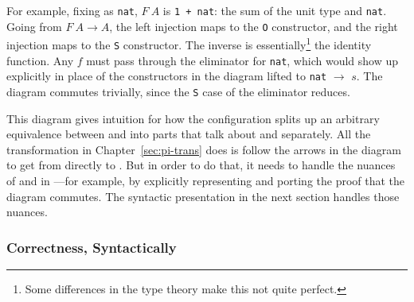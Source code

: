 For example, fixing \Aa as \lstinline{nat}, $F\ A$ is \lstinline{1 + nat}:
the sum of the unit type and \lstinline{nat}.
Going from $F\ A \rightarrow A$, the left injection maps to the \lstinline{O} constructor, and the right injection maps to the \lstinline{S} constructor.
The inverse is essentially\footnote{Some differences in the type theory make this not quite perfect.} the identity function.
Any $f$ must pass through the eliminator for \lstinline{nat}, which would show up explicitly in place of the constructors
in the diagram lifted to \lstinline{nat} $\rightarrow$ $s$.
The diagram commutes trivially, since the \lstinline{S} case of the eliminator reduces.

This diagram gives intuition for how the configuration splits up an arbitrary equivalence between \Aa and \B into
parts that talk about \Aa and \B separately. All the transformation in Chapter~\ref{sec:pi-trans} does is follow the arrows
in the diagram to get from \Aa directly to \B.
But in order to do that, it needs to handle the nuances of  and  in ---for example,
by explicitly representing and porting the proof that the diagram commutes.
The syntactic presentation in the next section handles those nuances.

\subsubsection{Correctness, Syntactically}
\label{sec:correct-cic}

